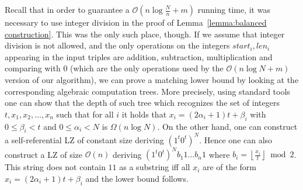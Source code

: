 \documentclass[runningheads]{llncs}
\begin{document}
Recall that in order to guarantee a $\mathcal{O}(n\log\frac{N}{n}+m)$ running time, it was necessary to use integer division in the proof of Lemma~\ref{lemma:balanced construction}. This was the only such place, though. If we assume that integer division is not allowed, and the only
operations on the integers $start_i,len_i$ appearing in the input triples are addition, subtraction, multiplication and comparing with $0$
(which are the only operations used by the $\mathcal{O}(n\log N+m)$ version of our algorithm), we can prove a matching lower bound by looking at
the corresponding algebraic computation trees. More precisely, using standard tools~\cite{Lubiw} one can show that the depth of such tree which recognizes the set of integers $t,x_1,x_2,\ldots,x_n$ such that for all $i$ it holds that $x_i=(2\alpha_i+1)t+\beta_i$ with $0\leq\beta_i<t$ 
and $0\leq \alpha_i< N$ is $\Omega(n\log N)$. On the other hand, one can construct a self-referential LZ of constant size deriving
$(1^t0^t)^N$. Hence one can also construct a LZ of size $\mathcal{O}(n)$ deriving $(1^t0^t)^N b_1 1 \ldots b_n 1$ where
$b_i= \left\lfloor\frac{x_i}{t}\right\rfloor\bmod 2$. This string does not contain $11$ as a substring iff all $x_i$ are of the form
$x_i=(2\alpha_i+1)t+\beta_i$ and the lower bound follows.







\end{document}

